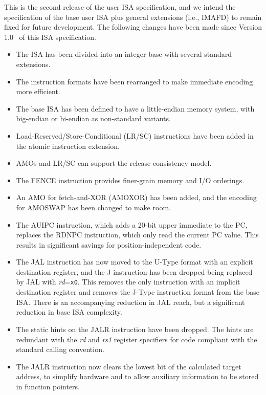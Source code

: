 This is the second release of the user ISA specification, and we
intend the specification of the base user ISA plus general extensions
(i.e., IMAFD) to remain fixed for future development.  The following
changes have been made since Version 1.0~\cite{riscvtr} of this ISA
specification.

\vspace{-0.1in}
\begin{itemize}
\parskip 0pt
\itemsep 1pt
\item The ISA has been divided into an integer base with several
  standard extensions.
\item The instruction formats have been rearranged to make immediate
  encoding more efficient.
\item The base ISA has been defined to have a little-endian memory system, with
  big-endian or bi-endian as non-standard variants.
\item Load-Reserved/Store-Conditional (LR/SC) instructions have been added in
  the atomic instruction extension.
\item AMOs and LR/SC can support the release consistency model.
\item The FENCE instruction provides finer-grain memory and I/O
  orderings. 
\item An AMO for fetch-and-XOR (AMOXOR) has been added, and the
  encoding for AMOSWAP has been changed to make room.
\item The AUIPC instruction, which adds a 20-bit upper immediate to
  the PC, replaces the RDNPC instruction, which only read the current
  PC value.  This results in significant savings for position-independent
  code.
\item The JAL instruction has now moved to the U-Type format with an
  explicit destination register, and the J instruction has been
  dropped being replaced by JAL with {\em rd}={\tt x0}.  This removes
  the only instruction with an implicit destination register and
  removes the J-Type instruction format from the base ISA.  There is
  an accompanying reduction in JAL reach, but a significant reduction
  in base ISA complexity.
\item The static hints on the JALR instruction have been dropped. The
  hints are redundant with the {\em rd} and {\em rs1} register
  specifiers for code compliant with the standard calling convention.
\item The JALR instruction now clears the lowest bit of the calculated
  target address, to simplify hardware and to allow auxiliary information
  to be stored in function pointers.

\end{itemize}
